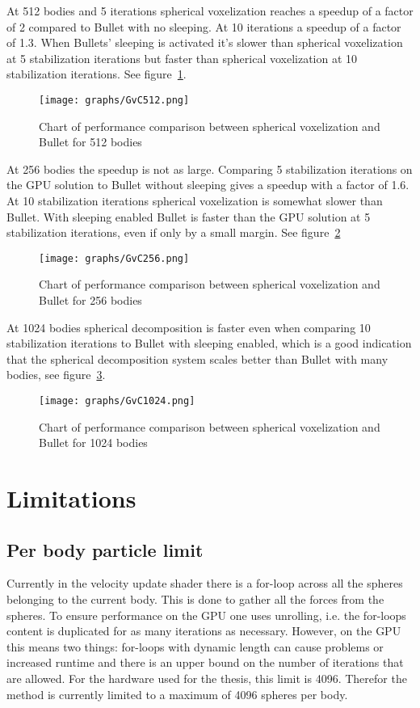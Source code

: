 At 512 bodies and 5 iterations spherical voxelization reaches a speedup of a factor of 2 compared to
Bullet with no sleeping. At 10 iterations a speedup of a factor of 1.3.
When Bullets' sleeping is activated it's slower than spherical voxelization at 5 stabilization iterations but faster than
spherical voxelization at 10 stabilization iterations. See figure~\ref{fig:GvC512}.

\begin{figure}[H]
  \centering
  \texttt{[image: graphs/GvC512.png]}
  \caption{Chart of performance comparison between spherical voxelization and Bullet for 512 bodies}
  \label{fig:GvC512}
\end{figure}

At 256 bodies the speedup is not as large. Comparing 5 stabilization iterations on the
GPU solution to Bullet without sleeping gives a speedup with a factor of 1.6.
At 10 stabilization iterations spherical voxelization is somewhat slower than Bullet.
With sleeping enabled Bullet is faster than the GPU solution at 5 stabilization iterations, even if
only by a small margin. See figure~\ref{fig:GvC256}

\begin{figure}[H]
  \centering
  \texttt{[image: graphs/GvC256.png]}
  \caption{Chart of performance comparison between spherical voxelization and Bullet for 256 bodies}
  \label{fig:GvC256}
\end{figure}

At 1024 bodies spherical decomposition is faster even when comparing 10 stabilization iterations
to Bullet with sleeping enabled, which is a good indication that the spherical decomposition system
scales better than Bullet with many bodies, see figure~\ref{fig:GvC1024}.

\begin{figure}[H]
  \centering
  \texttt{[image: graphs/GvC1024.png]}
  \caption{Chart of performance comparison between spherical voxelization and Bullet for 1024 bodies}
  \label{fig:GvC1024}
\end{figure}

\section{Limitations}
\subsection{Per body particle limit}
Currently in the velocity update shader there is a for-loop across all the spheres
belonging to the current body. This is done to gather all the forces from the spheres.
To ensure performance on the GPU one uses unrolling, i.e. the for-loops content is
duplicated for as many iterations as necessary. However, on the GPU this means two things:
for-loops with dynamic length can cause problems or increased runtime and there is an upper
bound on the number of iterations that are allowed. For the hardware used for the thesis,
this limit is 4096. Therefor the method is currently limited to a maximum of 4096
spheres per body.

